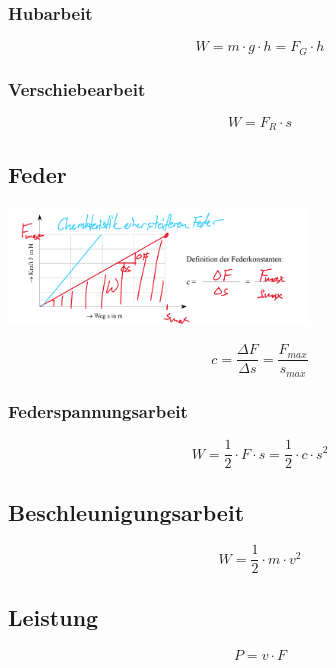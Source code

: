 \documentclass[a4paper]{IEEEtran}
\begin{document}
  \subsubsection{Hubarbeit}
  \begin{equation}
    W = m \cdot g \cdot h = F_G \cdot h
  \end{equation}
  \subsubsection{Verschiebearbeit}
  \begin{equation}
    W = F_R \cdot s
  \end{equation}

  \subsection{Feder}
  \begin{center}
    \includegraphics[width=8cm]{images/spring.png}
  \end{center}

  \begin{equation}
    c = \frac{\Delta F}{\Delta s} = \frac{F_{max}}{s_{max}}
  \end{equation}
  
  \subsubsection{Federspannungsarbeit}
  \begin{equation}
    W = \frac{1}{2} \cdot F \cdot s = \frac{1}{2} \cdot c \cdot s^2
  \end{equation}
  
  \subsection{Beschleunigungsarbeit}
  \begin{equation}
    W = \frac{1}{2} \cdot m \cdot v^2
  \end{equation}

  \subsection{Leistung}
  \begin{equation}
    P = v \cdot F
  \end{equation}
\end{document}
